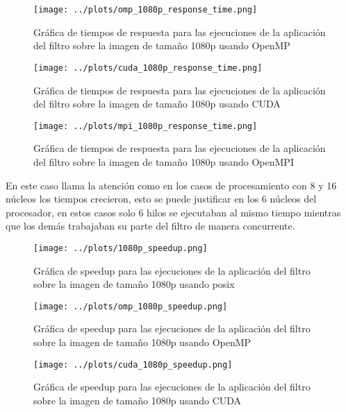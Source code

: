 \begin{figure}[H]
    \centering
    \texttt{[image: ../plots/omp\_1080p\_response\_time.png]}
    \caption{Gráfica de tiempos de respuesta para las ejecuciones de la aplicación del filtro sobre la imagen de tamaño 1080p usando OpenMP}
\end{figure}

\begin{figure}[H]
    \centering
    \texttt{[image: ../plots/cuda\_1080p\_response\_time.png]}
    \caption{Gráfica de tiempos de respuesta para las ejecuciones de la aplicación del filtro sobre la imagen de tamaño 1080p usando CUDA}
\end{figure}

\begin{figure}[H]
    \centering
    \texttt{[image: ../plots/mpi\_1080p\_response\_time.png]}
    \caption{Gráfica de tiempos de respuesta para las ejecuciones de la aplicación del filtro sobre la imagen de tamaño 1080p usando OpenMPI}
\end{figure}

En este caso llama la atención como en los casos de procesamiento con 8 y 16 núcleos los tiempos crecieron, esto se puede justificar en los 6 núcleos del procesador, en estos casos solo 6 hilos se ejecutaban al mismo tiempo mientras que los demás trabajaban su parte del filtro de manera concurrente.

\begin{figure}[H]
    \centering
    \texttt{[image: ../plots/1080p\_speedup.png]}
    \caption{Gráfica de speedup para las ejecuciones de la aplicación del filtro sobre la imagen de tamaño 1080p usando posix}
\end{figure}

\begin{figure}[H]
    \centering
    \texttt{[image: ../plots/omp\_1080p\_speedup.png]}
    \caption{Gráfica de speedup para las ejecuciones de la aplicación del filtro sobre la imagen de tamaño 1080p usando OpenMP}
\end{figure}

\begin{figure}[H]
    \centering
    \texttt{[image: ../plots/cuda\_1080p\_speedup.png]}
    \caption{Gráfica de speedup para las ejecuciones de la aplicación del filtro sobre la imagen de tamaño 1080p usando CUDA}
\end{figure}

